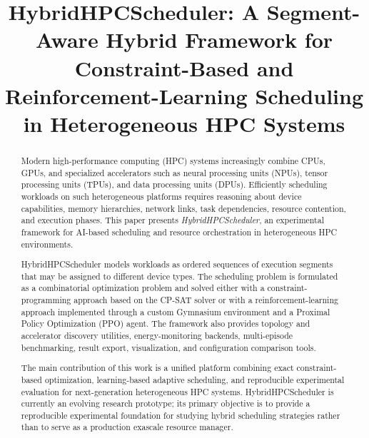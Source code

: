 \documentclass[conference]{IEEEtran}
\begin{document}
\title{HybridHPCScheduler: A Segment-Aware Hybrid Framework for
Constraint-Based and Reinforcement-Learning Scheduling in
Heterogeneous HPC Systems}

\author{
}

\maketitle

\begin{abstract}
Modern high-performance computing (HPC) systems increasingly combine CPUs,
GPUs, and specialized accelerators such as neural processing units (NPUs),
tensor processing units (TPUs), and data processing units (DPUs). Efficiently
scheduling workloads on such heterogeneous platforms requires reasoning about
device capabilities, memory hierarchies, network links, task dependencies,
resource contention, and execution phases. This paper presents
\textit{HybridHPCScheduler}, an experimental framework for AI-based scheduling
and resource orchestration in heterogeneous HPC environments.

HybridHPCScheduler models workloads as ordered sequences of execution segments
that may be assigned to different device types. The scheduling problem is
formulated as a combinatorial optimization problem and solved either with a
constraint-programming approach based on the CP-SAT solver or with a
reinforcement-learning approach implemented through a custom Gymnasium
environment and a Proximal Policy Optimization (PPO) agent. The framework also
provides topology and accelerator discovery utilities, energy-monitoring
backends, multi-episode benchmarking, result export, visualization, and
configuration comparison tools.

The main contribution of this work is a unified platform combining exact
constraint-based optimization, learning-based adaptive scheduling, and
reproducible experimental evaluation for next-generation heterogeneous HPC
systems. HybridHPCScheduler is currently an evolving research prototype; its
primary objective is to provide a reproducible experimental foundation for
studying hybrid scheduling strategies rather than to serve as a production
exascale resource manager.
\end{abstract}
\end{document}
